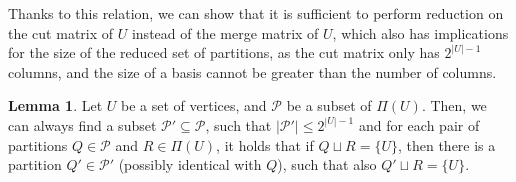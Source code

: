 \documentclass[thesis=M,english,hidelinks]{FITthesis}[2012/10/20]
\theoremstyle{definition}
\newtheorem{lemma}{Lemma}
\begin{document}
Thanks to this relation, we can show that it is sufficient to perform reduction on the cut matrix of $U$ instead of the
merge matrix of $U$, which also has implications for the size of the reduced set of partitions, as the cut matrix only
has $2^{|U|-1}$ columns, and the size of a basis cannot be greater than the number of columns.

\begin{lemma}
    \label{lemma:creduce}
    Let $U$ be a set of vertices, and $\mathcal{P}$ be a subset of $\Pi(U)$. Then, we can always find a subset
    $\mathcal{P}' \subseteq \mathcal{P}$, such that $|\mathcal{P}'| \leq 2^{|U|-1}$ and for each pair of partitions $Q
    \in \mathcal{P}$ and $R \in \Pi(U)$, it holds that if $Q \sqcup R = \{U\}$, then there is a partition $Q' \in
    \mathcal{P}'$ (possibly identical with $Q$), such that also $Q' \sqcup R = \{U\}$.
\end{lemma}
\end{document}
